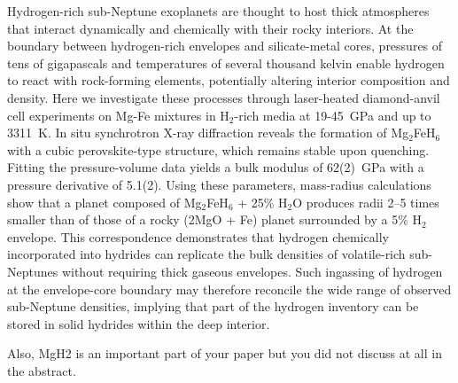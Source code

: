 \documentclass[draft,jgrga,12pt]{agujournal2019}
\begin{document}
Hydrogen-rich sub-Neptune exoplanets are thought to host thick atmospheres that interact dynamically and chemically with their rocky interiors. 
At the boundary between hydrogen-rich envelopes and silicate-metal cores, pressures of tens of gigapascals and temperatures of several thousand kelvin enable hydrogen to react with rock-forming elements, potentially altering interior composition and density. 
Here we investigate these processes through laser-heated diamond-anvil cell experiments on Mg-Fe mixtures in H$_2$-rich media at 19-45~{GPa} and up to 3311~K\@.  
In situ synchrotron X-ray diffraction reveals the formation of Mg$_2$FeH$_6$ with a cubic perovskite-type structure, which remains stable upon quenching. 
Fitting the pressure-volume data yields a bulk modulus of 62(2)~{GPa} with a pressure derivative of 5.1(2). 
Using these parameters, mass-radius calculations show that a planet composed of Mg$_2$FeH$_6$ + 25\% H$_2$O produces radii 2--5 times smaller than of those of a rocky (2MgO + Fe) planet surrounded by a 5\% H$_2$ envelope. 
This correspondence demonstrates that hydrogen chemically incorporated into hydrides can replicate the bulk densities of volatile-rich sub-Neptunes without requiring thick gaseous envelopes. 
Such ingassing of hydrogen at the envelope-core boundary may therefore reconcile the wide range of observed sub-Neptune densities, implying that part of the hydrogen inventory can be stored in solid hydrides within the deep interior. 

\begin{cbox}
    Also, MgH2 is an important part of your paper but you did not discuss at all in the abstract.
\end{cbox}
\end{document}
